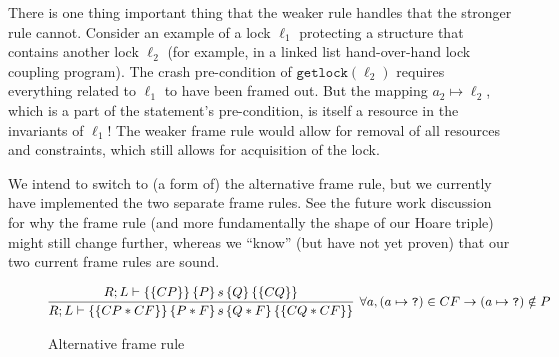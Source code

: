 There is one thing important thing that the weaker rule handles that the
stronger rule cannot. Consider an example of a lock $\ell_1$ protecting a
structure that contains another lock $\ell_2$ (for example, in a linked list
hand-over-hand lock coupling program). The crash pre-condition of
$\texttt{getlock}(\ell_2)$ requires everything related to $\ell_1$ to have been
framed out. But the mapping $a_2\mapsto\ell_2$, which is a part of the
statement's pre-condition, is itself a resource in the invariants of $\ell_1$!
The weaker frame rule would allow for removal of all resources and constraints,
which still allows for acquisition of the lock.

We intend to switch to (a form of) the alternative frame rule, but we currently
have implemented the two separate frame rules. See the future work discussion
for why the frame rule (and more fundamentally the shape of our Hoare triple)
might still change further, whereas we ``know'' (but have not yet proven) that
our two current frame rules are sound.

\begin{figure*}
\begin{gather*}
    \infer[\forall a, (a \mapsto\texttt{?}) \in CF \imp
    (a\mapsto\texttt{?}) \notin P]
	{\hoarestmt{R}{L}{CP * CF}{P * F}{s}{Q * F}{CQ * CF}}
	{\hoarestmt{R}{L}{CP}{P}{s}{Q}{CQ}}
\end{gather*}
\caption{Alternative frame rule}
\label{fig:altframe}
\end{figure*}

%

